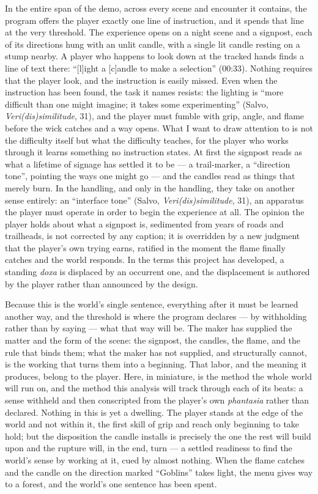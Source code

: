 \documentclass{article}
\begin{document}
In the entire span of the demo, across every scene and encounter it contains, the program offers the player exactly one line of instruction, and it spends that line at the very threshold. The experience opens on a night scene and a signpost, each of its directions hung with an unlit candle, with a single lit candle resting on a stump nearby. A player who happens to look down at the tracked hands finds a line of text there: ``[l]ight a [c]andle to make a selection'' (00:33). Nothing requires that the player look, and the instruction is easily missed. Even when the instruction has been found, the task it names resists: the lighting is ``more difficult than one might imagine; it takes some experimenting'' (Salvo, \textit{Veri(dis)similitude}, 31), and the player must fumble with grip, angle, and flame before the wick catches and a way opens. What I want to draw attention to is not the difficulty itself but what the difficulty teaches, for the player who works through it learns something no instruction states. At first the signpost reads as what a lifetime of signage has settled it to be — a trail-marker, a ``direction tone'', pointing the ways one might go — and the candles read as things that merely burn. In the handling, and only in the handling, they take on another sense entirely: an ``interface tone'' (Salvo, \textit{Veri(dis)similitude}, 31), an apparatus the player must operate in order to begin the experience at all. The opinion the player holds about what a signpost is, sedimented from years of roads and trailheads, is not corrected by any caption; it is overridden by a new judgment that the player's own trying earns, ratified in the moment the flame finally catches and the world responds. In the terms this project has developed, a standing \textit{doxa} is displaced by an occurrent one, and the displacement is authored by the player rather than announced by the design.

Because this is the world's single sentence, everything after it must be learned another way, and the threshold is where the program declares — by withholding rather than by saying — what that way will be. The maker has supplied the matter and the form of the scene: the signpost, the candles, the flame, and the rule that binds them; what the maker has not supplied, and structurally cannot, is the working that turns them into a beginning. That labor, and the meaning it produces, belong to the player. Here, in miniature, is the method the whole world will run on, and the method this analysis will track through each of its beats: a sense withheld and then conscripted from the player's own \textit{phantasia} rather than declared. Nothing in this is yet a dwelling. The player stands at the edge of the world and not within it, the first skill of grip and reach only beginning to take hold; but the disposition the candle installs is precisely the one the rest will build upon and the rupture will, in the end, turn — a settled readiness to find the world's sense by working at it, cued by almost nothing. When the flame catches and the candle on the direction marked ``Goblins'' takes light, the menu gives way to a forest, and the world's one sentence has been spent.
\end{document}

